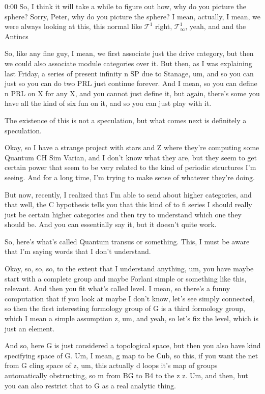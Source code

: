 \begin{unfinished}{0:00}
So, I think it will take a while to figure out how, why do you picture the sphere? Sorry, Peter, why do you picture the sphere? I mean, actually, I mean, we were always looking at this, this normal like $\mathcal{T}^1$ right, $\mathcal{T}^1_\infty$, yeah, and and the 
Antincs

So, like any fine guy, I mean, we first associate just the drive category, but then we could also associate module categories over it. But then, as I was explaining last Friday, a series of present infinity n SP due to Stanage, um, and so you can just so you can do two PRL just continue forever. And I mean, so you can define n PRL on X for any X, and you cannot just define it, but again, there's some you have all the kind of six fun on it, and so you can just play with it.

The existence of this is not a speculation, but what comes next is definitely a speculation.

Okay, so I have a strange project with stars and Z where they're computing some Quantum CH Sim Varian, and I don't know what they are, but they seem to get certain power that seem to be very related to the kind of periodic structures I'm seeing. And for a long time, I'm trying to make sense of whatever they're doing.

But now, recently, I realized that I'm able to send about higher categories, and that well, the C hypothesis tells you that this kind of to fi series I should really just be certain higher categories and then try to understand which one they should be. And you can essentially say it, but it doesn't quite work.

So, here's what's called Quantum transus or something. This, I must be aware that I'm saying words that I don't understand.

Okay, so, so, so, to the extent that I understand anything, um, you have maybe start with a complete group and maybe Forlani simple or something like this, relevant. And then you fit what's called level. I mean, so there's a funny computation that if you look at maybe I don't know, let's see simply connected, so then the first interesting formology group of G is a third formology group, which I mean a simple assumption z, um, and yeah, so let's fix the level, which is just an element.

And so, here G is just considered a topological space, but then you also have kind specifying space of G. Um, I mean, g map to be Cub, so this, if you want the net from G cling space of z, um, this actually d loops it's map of groups automatically obstructing, so m from BG to B4 to the z z. Um, and then, but you can also restrict that to G as a real analytic thing.


\end{unfinished}
